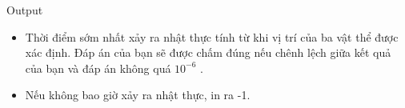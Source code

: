Output  
\begin{itemize}
	\item     Thời điểm sớm nhất xảy ra nhật thực tính từ khi vị trí của ba vật thể được xác định. Đáp án của bạn sẽ được chấm đúng nếu chênh lệch giữa kết quả của bạn và đáp án không quá $10^{-6}$    .   
	\item     Nếu không bao giờ xảy ra nhật thực, in ra -1.   
\end{itemize}